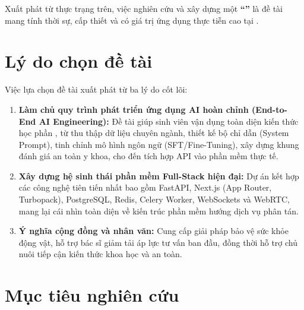 Xuất phát từ thực trạng trên, việc nghiên cứu và xây dựng một \textbf{``\reporttitle''} là đề tài mang tính thời sự, cấp thiết và có giá trị ứng dụng thực tiễn cao tại \university.

\section{Lý do chọn đề tài}
\label{sec:lydo}

Việc lựa chọn đề tài xuất phát từ ba lý do cốt lõi:
\begin{enumerate}[label=\arabic*)]
    \item \textbf{Làm chủ quy trình phát triển ứng dụng AI hoàn chỉnh (End-to-End AI Engineering):} Đề tài giúp sinh viên vận dụng toàn diện kiến thức học phần \course, từ thu thập dữ liệu chuyên ngành, thiết kế bộ chỉ dẫn (System Prompt), tinh chỉnh mô hình ngôn ngữ (SFT/Fine-Tuning), xây dựng khung đánh giá an toàn y khoa, cho đến tích hợp API vào phần mềm thực tế.
    \item \textbf{Xây dựng hệ sinh thái phần mềm Full-Stack hiện đại:} Dự án kết hợp các công nghệ tiên tiến nhất bao gồm FastAPI, Next.js (App Router, Turbopack), PostgreSQL, Redis, Celery Worker, WebSockets và WebRTC, mang lại cái nhìn toàn diện về kiến trúc phần mềm hướng dịch vụ phân tán.
    \item \textbf{Ý nghĩa cộng đồng và nhân văn:} Cung cấp giải pháp bảo vệ sức khỏe động vật, hỗ trợ bác sĩ giảm tải áp lực tư vấn ban đầu, đồng thời hỗ trợ chủ nuôi tiếp cận kiến thức khoa học và an toàn.
\end{enumerate}

\section{Mục tiêu nghiên cứu}
\label{sec:muctieu}

